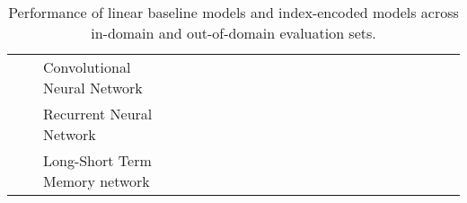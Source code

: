 \begin{landscape}
\begin{table}[]
{\begin{tabular}{ccl|llll|llll|llll|llll|llll}
                                     &                         & Convolutional Neural Network   &$     $&$     $&$     $&$     $&$     $&$     $&$     $&$     $&$     $&$     $&$     $&$     $&$     $&$     $&$     $&$     $  &$     $&$     $&$     $&$     $\\
                                     &                         & Recurrent Neural Network       &$     $&$     $&$     $&$     $&$     $&$     $&$     $&$     $&$     $&$     $&$     $&$     $&$     $&$     $&$     $&$     $  &$     $&$     $&$     $&$     $\\
                                     &                         & Long-Short Term Memory network &$     $&$     $&$     $&$     $&$     $&$     $&$     $&$     $&$     $&$     $&$     $&$     $&$     $&$     $&$     $&$     $  &$     $&$     $&$     $&$     $
\end{tabular}%
}
\caption{Performance of linear baseline models and index-encoded models across in-domain and out-of-domain evaluation sets.}
\label{tab:redux_embedding_davidson}
\end{table}
\end{landscape}

